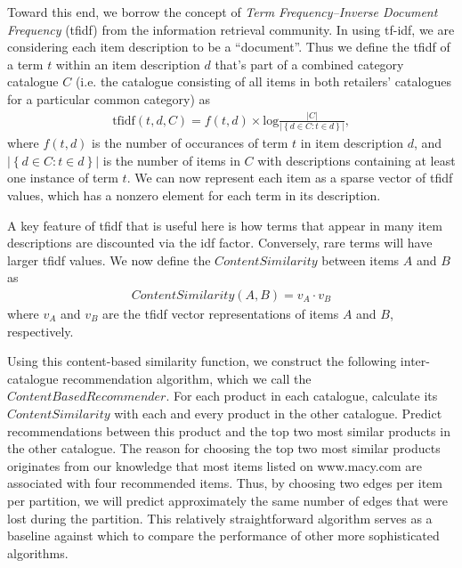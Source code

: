 \documentclass[11pt]{article}
\begin{document}
Toward this end, we borrow the concept of {\em Term Frequency--Inverse Document
Frequency} (tfidf) from the information retrieval community. In using tf-idf, we
are considering each item description to be a ``document''.  Thus we define the
tfidf of a term $t$ within an item description $d$ that's part of a combined
category catalogue $C$ (i.e. the catalogue consisting of all items in both
retailers' catalogues for a particular common category) as
\begin{align}
\mathrm{tfidf}(t,d,C) = f(t,d) \times
\mathrm{log}\frac{\left|C\right|}{\left|\left\{d \in C : t \in
d\right\}\right|},
\end{align}
where $f(t,d)$ is the number of occurances of term $t$ in item description $d$,
and $\left|\left\{d \in C : t \in d\right\}\right|$ is the number of items in
$C$ with descriptions containing at least one instance of term $t$.  We can now
represent each item as a sparse vector of tfidf values, which has a nonzero
element for each term in its description.

A key feature of tfidf that is useful here is how terms that appear in many item
descriptions are discounted via the idf factor. Conversely, rare terms will have
larger tfidf values. We now define the $ContentSimilarity$ between items $A$ and
$B$ as
\begin{align}
ContentSimilarity(A,B) = v_A \cdot v_B
\end{align}
where $v_A$ and $v_B$ are the tfidf vector representations of items $A$ and $B$,
respectively.

Using this content-based similarity function, we construct the following
inter-catalogue recommendation algorithm, which we call the $ContentBased
Recommender$. For each product in each catalogue, calculate its
$ContentSimilarity$ with each and every product in the other catalogue. Predict
recommendations between this product and the top two most similar products in
the other catalogue. The reason for choosing the top two most similar products
originates from our knowledge that most items listed on www.macy.com are
associated with four recommended items. Thus, by choosing two edges per item per
partition, we will predict approximately the same number of edges that were lost
during the partition. This relatively straightforward algorithm serves as a
baseline against which to compare the performance of other more sophisticated
algorithms.
\end{document}
